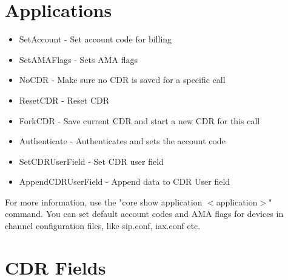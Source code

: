 \section{Applications}

\begin{itemize}
    \item SetAccount - Set account code for billing
    \item SetAMAFlags - Sets AMA flags
    \item NoCDR - Make sure no CDR is saved for a specific call
    \item ResetCDR - Reset CDR
    \item ForkCDR - Save current CDR and start a new CDR for this call
    \item Authenticate - Authenticates and sets the account code
    \item SetCDRUserField - Set CDR user field
    \item AppendCDRUserField - Append data to CDR User field
\end{itemize}

For more information, use the "core show application $<$application$>$" command.
You can set default account codes and AMA flags for devices in
channel configuration files, like sip.conf, iax.conf etc.

\section{CDR Fields}

